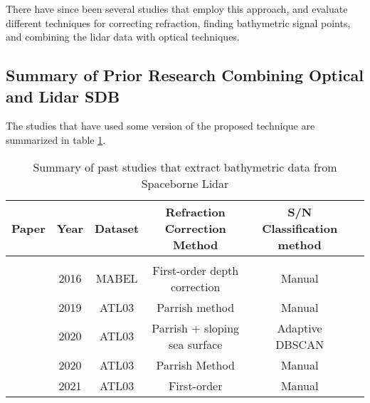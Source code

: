 There have since been several studies that employ this approach, and evaluate different techniques for correcting refraction, finding bathymetric signal points, and combining the lidar data with optical techniques.

\subsection{Summary of Prior Research Combining Optical and Lidar SDB}

The studies that have used some version of the proposed technique are summarized in table \ref{tab:researchsummary}.

\begin{table}
      \caption{Summary of past studies that extract bathymetric data from Spaceborne Lidar}
      \label{tab:researchsummary}
      \raggedright
      \begin{tabular}{rccccc}
            \midrule
            Paper                              & Year & Dataset & Refraction Correction Method  & S/N Classification method     \\ %
            \hline                                                                                                              \\ %
            \citeauthor{Forfinski-Sarkozi2016} & 2016 & MABEL   & First-order depth correction  & Manual                        \\ %
            \citeauthor{Parrish2019}           & 2019 & ATL03   & Parrish method                & Manual                        \\ %
            \citeauthor{Ma2020}                & 2020 & ATL03   & Parrish + sloping sea surface & Adaptive DBSCAN               \\ %
            \citeauthor{Thomas2021d}           & 2020 & ATL03   & Parrish Method                & Manual                        \\ %
            \citeauthor{Albright2021}          & 2021 & ATL03   & First-order                   & Manual                        \\ %

\end{tabular}
\end{table}
